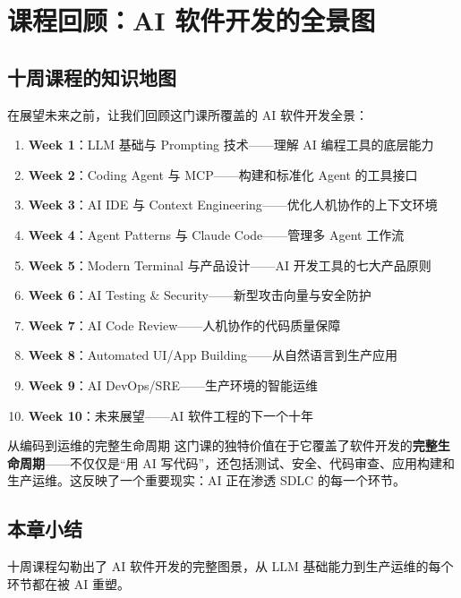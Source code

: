 \section{课程回顾：AI 软件开发的全景图}

\subsection{十周课程的知识地图}

在展望未来之前，让我们回顾这门课所覆盖的 AI 软件开发全景：

\begin{enumerate}
    \item \textbf{Week 1}：LLM 基础与 Prompting 技术——理解 AI 编程工具的底层能力
    \item \textbf{Week 2}：Coding Agent 与 MCP——构建和标准化 Agent 的工具接口
    \item \textbf{Week 3}：AI IDE 与 Context Engineering——优化人机协作的上下文环境
    \item \textbf{Week 4}：Agent Patterns 与 Claude Code——管理多 Agent 工作流
    \item \textbf{Week 5}：Modern Terminal 与产品设计——AI 开发工具的七大产品原则
    \item \textbf{Week 6}：AI Testing \& Security——新型攻击向量与安全防护
    \item \textbf{Week 7}：AI Code Review——人机协作的代码质量保障
    \item \textbf{Week 8}：Automated UI/App Building——从自然语言到生产应用
    \item \textbf{Week 9}：AI DevOps/SRE——生产环境的智能运维
    \item \textbf{Week 10}：未来展望——AI 软件工程的下一个十年
\end{enumerate}

\begin{knowledgebox}{从编码到运维的完整生命周期}
这门课的独特价值在于它覆盖了软件开发的\textbf{完整生命周期}——不仅仅是``用 AI 写代码''，还包括测试、安全、代码审查、应用构建和生产运维。这反映了一个重要现实：AI 正在渗透 SDLC 的每一个环节。
\end{knowledgebox}

\subsection{本章小结}

十周课程勾勒出了 AI 软件开发的完整图景，从 LLM 基础能力到生产运维的每个环节都在被 AI 重塑。

